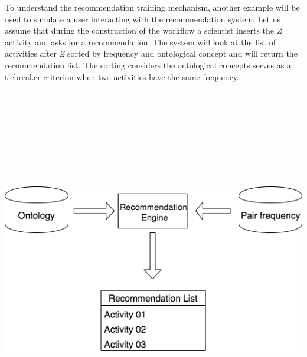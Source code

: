 \documentclass[ a0, portrait]{a0poster}
\begin{document}
\begin{multicols}{2}
To understand the recommendation training mechanism, another example will be used to simulate a user interacting with the recommendation system. Let us assume that during the construction of the workflow a scientist inserts the \emph{Z} activity and asks for a recommendation. The system will look at the list of activities after \emph{Z} sorted by frequency and ontological concept and will return the recommendation list. The sorting considers the ontological concepts serves as a tiebreaker criterion when two activities have the same frequency.
\vspace{1cm}
\begin{center}
\includegraphics[height=16cm, width=28cm]{recEng.png}
\end{center}
\vspace{1cm}



\end{multicols}
\end{document}
